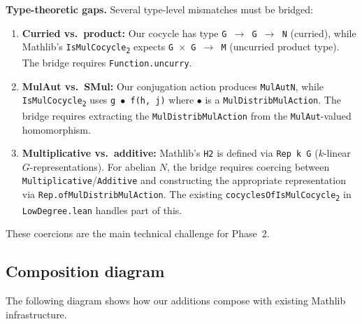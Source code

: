 \documentclass[11pt]{article}
\begin{document}
\textbf{Type-theoretic gaps.} Several type-level mismatches must be bridged:
\begin{enumerate}[nosep]
\item \textbf{Curried vs.\ product:} Our cocycle has type \texttt{G $\to$ G $\to$ N}
  (curried), while Mathlib's \texttt{IsMulCocycle\textsubscript{2}} expects
  \texttt{G $\times$ G $\to$ M} (uncurried product type). The bridge requires
  \texttt{Function.uncurry}.
\item \textbf{MulAut vs.\ SMul:} Our conjugation action produces \texttt{MulAut\;N},
  while \texttt{IsMulCocycle\textsubscript{2}} uses \texttt{g $\bullet$ f(h, j)} where
  $\bullet$ is a \texttt{MulDistribMulAction}. The bridge requires extracting the
  \texttt{MulDistribMulAction} from the \texttt{MulAut}-valued homomorphism.
\item \textbf{Multiplicative vs.\ additive:} Mathlib's \texttt{H2} is defined via
  \texttt{Rep k G} ($k$-linear $G$-representations). For abelian $N$, the bridge
  requires coercing between \texttt{Multiplicative}/\texttt{Additive} and constructing
  the appropriate representation via \texttt{Rep.ofMulDistribMulAction}. The existing
  \texttt{cocyclesOfIsMulCocycle\textsubscript{2}} in \texttt{LowDegree.lean} handles
  part of this.
\end{enumerate}
These coercions are the main technical challenge for Phase~2.

\subsection{Composition diagram}

The following diagram shows how our additions compose with existing Mathlib infrastructure.
\end{document}
